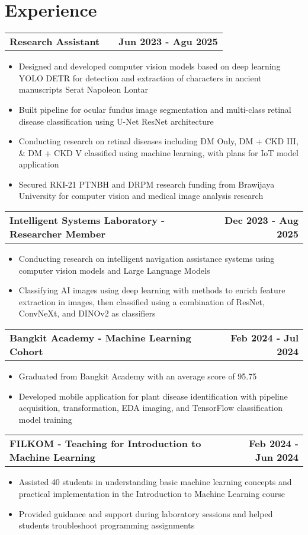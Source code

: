 \documentclass[a4paper,12pt]{article}
\makeatletter
\newenvironment{joblong}[2]
    {
    \begin{tabularx}{\linewidth}{@{}l X r@{}}
    \textbf{#1} & \hfill &  #2 \\[3.75pt]
    \end{tabularx}
    \begin{minipage}[t]{\linewidth}
    \begin{itemize}[nosep,after=\strut, leftmargin=1em, itemsep=3pt,label=--]
    }
    {
    \end{itemize}
    \end{minipage}    
    }
\makeatother
\begin{document}
\section{Experience}

\begin{joblong}{Research Assistant}{\textbf{Jun 2023 - Agu 2025}}
\item Designed and developed computer vision models based on deep learning YOLO DETR for detection and extraction of characters in ancient manuscripts Serat Napoleon Lontar
\item Built pipeline for ocular fundus image segmentation and multi-class retinal disease classification using U-Net ResNet architecture
\item Conducting research on retinal diseases including DM Only, DM + CKD III, \& DM + CKD V classified using machine learning, with plans for IoT model application
\item Secured RKI-21 PTNBH and DRPM research funding from Brawijaya University for computer vision and medical image analysis research
\end{joblong}

\begin{joblong}{Intelligent Systems Laboratory - Researcher Member}{\textbf{Dec 2023 - Aug 2025}}
\item Conducting research on intelligent navigation assistance systems using computer vision models and Large Language Models
\item Classifying AI images using deep learning with methods to enrich feature extraction in images, then classified using a combination of ResNet, ConvNeXt, and DINOv2 as classifiers
\end{joblong}

\begin{joblong}{Bangkit Academy - Machine Learning Cohort}{\textbf{Feb 2024 - Jul 2024}}
\item Graduated from Bangkit Academy with an average score of 95.75
\item Developed mobile application for plant disease identification with pipeline acquisition, transformation, EDA imaging, and TensorFlow classification model training
\end{joblong}

\begin{joblong}{FILKOM - Teaching for Introduction to Machine Learning}{\textbf{Feb 2024 - Jun 2024}}
\item Assisted 40 students in understanding basic machine learning concepts and practical implementation in the Introduction to Machine Learning course
\item Provided guidance and support during laboratory sessions and helped students troubleshoot programming assignments
\end{joblong}
\end{document}
